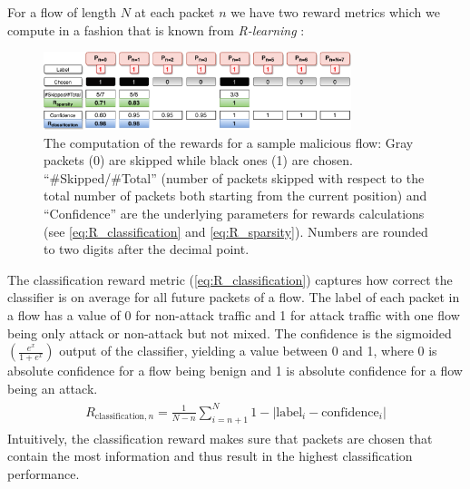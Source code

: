 \documentclass[conference]{IEEEtran}
\begin{document}

For a flow of length $N$ at each packet $n$ we have two reward metrics which we compute in a fashion that is known from \textit{R-learning} \cite{schwartz_reinforcement_1993}:


\begin{figure}
\centering
  \includegraphics[width=0.8\textwidth]{img/rewards_calc_example.pdf}
  \caption{The computation of the rewards for a sample malicious flow: Gray packets (0) are skipped while black ones (1) are chosen. ``\#Skipped\//\#Total'' (number of packets skipped with respect to the total number of packets both starting from the current position) and ``Confidence'' are the underlying parameters for rewards calculations (see \autoref{eq:R_classification} and \autoref{eq:R_sparsity}). Numbers are rounded to two digits after the decimal point.}
  \label{fig:rewards}
\end{figure}

The classification reward metric (\autoref{eq:R_classification}) captures how correct the classifier is on average for all future packets of a flow. The label of each packet in a flow has a value of 0 for non-attack traffic and 1 for attack traffic with one flow being only attack or non-attack but not mixed. The confidence is the sigmoided $\left(\frac{e^x}{1+e^x}\right)$ output of the classifier, yielding a value between 0 and 1, where 0 is absolute confidence for a flow being benign and 1 is absolute confidence for a flow being an attack.
\begin{align}
\begin{split}
R_{\text{classification},n} = \frac{1}{N-n} \sum_{i=n+1}^{N} 1 - |\text{label}_i - \text{confidence}_i|
\end{split}
\label{eq:R_classification}
\end{align}
Intuitively, the classification reward makes sure that packets are chosen that contain the most information and thus result in the highest classification performance.
\end{document}

